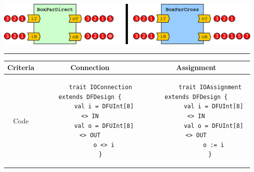 \begin{table}[t!]
\begin{minipage}[t][13cm][b]{0.64\linewidth}
    \vfill
    \label{fig:BoxTopDraw}
    \includegraphics[width=\linewidth]{graphics/connectivityTokens.pdf}
    \label{fig:BoxTopTokens}
  \end{minipage}%
  \vspace{2ex}
  \hrule
  \vspace{2ex}
  \label{tbl:Box}
  \begin{tabular}{|c|c|c|}
    \hline 
    \textbf{Criteria} & \textbf{Connection \code{<>}} & \textbf{Assignment \code{:=}} \\ 
    \hline
    \begin{minipage}{0.1\textwidth}
      \flushleft
      Code
    \end{minipage} 
    &
    \begin{minipage}[c][1.5cm]{0.4\textwidth}
      \begin{verbatim}
      trait IOConnection extends DFDesign {
        val i = DFUInt[8] <> IN
        val o = DFUInt[8] <> OUT
        o <> i
      }
      \end{verbatim}
    \end{minipage} 
    &  
    \begin{minipage}[c][1.5cm]{0.4\textwidth}
      \begin{verbatim}
        trait IOAssignment extends DFDesign {
          val i = DFUInt[8] <> IN
          val o = DFUInt[8] <> OUT
          o := i
        }
      \end{verbatim}
    \end{minipage} 
    \\ 

\end{tabular}
\end{table}
